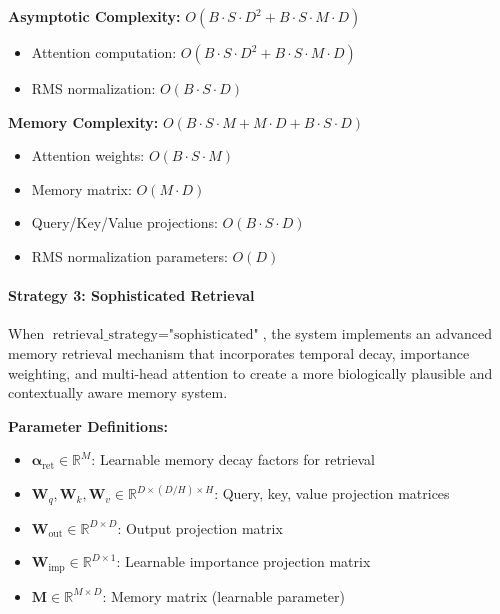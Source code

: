 \documentclass{article}
\begin{document}
\begin{enumerate}
\textbf{Asymptotic Complexity:} $O(B \cdot S \cdot D^2 + B \cdot S \cdot M \cdot D)$
\begin{itemize}
\item Attention computation: $O(B \cdot S \cdot D^2 + B \cdot S \cdot M \cdot D)$
\item RMS normalization: $O(B \cdot S \cdot D)$
\end{itemize}

\textbf{Memory Complexity:} $O(B \cdot S \cdot M + M \cdot D + B \cdot S \cdot D)$
\begin{itemize}
\item Attention weights: $O(B \cdot S \cdot M)$
\item Memory matrix: $O(M \cdot D)$
\item Query/Key/Value projections: $O(B \cdot S \cdot D)$
\item RMS normalization parameters: $O(D)$
\end{itemize}
\end{enumerate}

\paragraph{Strategy 3: Sophisticated Retrieval}

When $\text{retrieval\_strategy} = \text{"sophisticated"}$, the system implements an advanced memory retrieval mechanism that incorporates temporal decay, importance weighting, and multi-head attention to create a more biologically plausible and contextually aware memory system.

\textbf{Parameter Definitions:}
\begin{itemize}
\item $\boldsymbol{\alpha}_{\text{ret}} \in \mathbb{R}^{M}$: Learnable memory decay factors for retrieval
\item $\mathbf{W}_q, \mathbf{W}_k, \mathbf{W}_v \in \mathbb{R}^{D \times (D/H) \times H}$: Query, key, value projection matrices
\item $\mathbf{W}_{\text{out}} \in \mathbb{R}^{D \times D}$: Output projection matrix
\item $\mathbf{W}_{\text{imp}} \in \mathbb{R}^{D \times 1}$: Learnable importance projection matrix
\item $\mathbf{M} \in \mathbb{R}^{M \times D}$: Memory matrix (learnable parameter)
\end{itemize}
\end{document}
